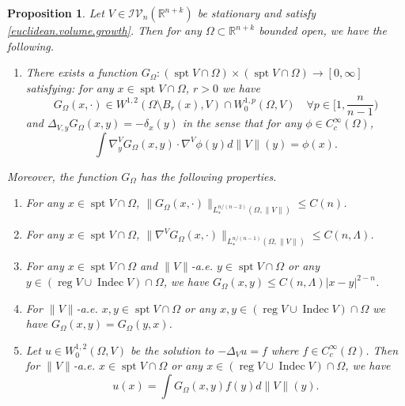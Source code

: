 \documentclass[11pt]{amsart}
\newtheorem{proposition}[theorem]{Proposition}
\theoremstyle{definition}
\newcommand{\R}{\mathbb{R}}
\newcommand{\IV}{\mathcal{IV}}
\DeclareMathOperator{\spt}{spt}
\DeclareMathOperator{\reg}{reg}
\DeclareMathOperator{\indec}{Indec}
\begin{document}
\begin{proposition}\label{DiriGreen}
	Let $V\in \IV_n(\R^{n+k})$ be stationary and satisfy \eqref{euclidean.volume.growth}. Then for any $\Omega\subset \R^{n+k}$ bounded open, we have the following.
	\begin{enumerate}
		\item[(i)]  There exists a function $G_\Omega:(\spt V\cap \Omega)\times (\spt V\cap \Omega)\to [0,\infty]$
		satisfying: for any $x\in \spt V\cap \Omega$, $r>0$ we have 
		\begin{equation}\label{w1p.dirichlet}
			G_\Omega(x,\cdot)\in W^{1,2}( \Omega\setminus B_{r}(x),V)\cap W^{1,p}_0(\Omega,V)\quad \forall p\in [1,\frac{n}{n-1})
		\end{equation}
		and  $\Delta_{V,y} G_\Omega(x,y)=-\delta_x(y)$ in the sense that for any $\phi\in C_c^\infty(\Omega)$, 
		\begin{equation}\label{delta.dirichlet}
			\int\nabla _y^V G_\Omega(x,y) \cdot \nabla^V\phi(y)d\|V\|(y)=\phi(x).
		\end{equation}
	\end{enumerate}
	Moreover, the function $G_\Omega$ has the following properties.
	\begin{enumerate}
		\item[(ii)] For any $x\in \spt V\cap \Omega$, $\|G_\Omega(x,\cdot)\|_{L_*^{n/(n-2)}(\Omega,\|V\|)}\le C(n)$.
		
		\item[(iii)] For any $x\in \spt V\cap \Omega$, $\|\nabla^V G_\Omega(x,\cdot)\|_{L_*^{n/(n-1)}(\Omega,\|V\|)}\le C(n,\Lambda)$.
		
		\item[(iv)] For  any $x\in \spt V\cap \Omega$ and $\|V\|$-a.e. $y\in\spt V\cap \Omega$ or any $y\in (\reg V\cup \indec V)\cap \Omega$, we have $G_\Omega(x,y)\le C(n,\Lambda)|x-y|^{2-n}$.
		
		\item[(v)] For $\|V\|$-a.e. $x,y\in \spt V\cap\Omega$ or any $x,y\in (\reg V\cup \indec V)\cap \Omega$ we have $G_\Omega(x,y)=G_\Omega(y,x)$.
		
		\item[(vi)]Let $u\in W_{0}^{1,2}(\Omega,V)$ be the solution to $-\Delta_V u=f$ where $f\in C_c^\infty (\Omega)$. Then for $\|V\|$-a.e. $x\in \spt V\cap \Omega$ or any $x\in(\reg V\cup \indec V)\cap \Omega$, we have 
		\[u(x)=\int G_\Omega(x,y)f(y)d\|V\|(y).\]
	\end{enumerate}
\end{proposition}
\end{document}
